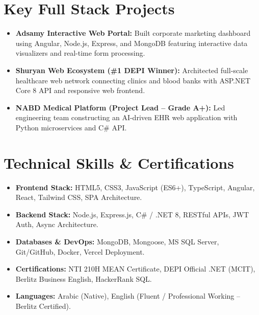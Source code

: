 \documentclass[11pt,a4paper]{article}
\begin{document}
\section{Key Full Stack Projects}
\begin{itemize}[leftmargin=*, nosep]
    \item \textbf{Adsamy Interactive Web Portal:} Built corporate marketing dashboard using Angular, Node.js, Express, and MongoDB featuring interactive data visualizers and real-time form processing.
    \item \textbf{Shuryan Web Ecosystem (\#1 DEPI Winner):} Architected full-scale healthcare web network connecting clinics and blood banks with ASP.NET Core 8 API and responsive web frontend.
    \item \textbf{NABD Medical Platform (Project Lead -- Grade A+):} Led engineering team constructing an AI-driven EHR web application with Python microservices and C\# API.
\end{itemize}

\section{Technical Skills \& Certifications}
\begin{itemize}[leftmargin=*, nosep]
    \item \textbf{Frontend Stack:} HTML5, CSS3, JavaScript (ES6+), TypeScript, Angular, React, Tailwind CSS, SPA Architecture.
    \item \textbf{Backend Stack:} Node.js, Express.js, C\# / .NET 8, RESTful APIs, JWT Auth, Async Architecture.
    \item \textbf{Databases \& DevOps:} MongoDB, Mongoose, MS SQL Server, Git/GitHub, Docker, Vercel Deployment.
    \item \textbf{Certifications:} NTI 210H MEAN Certificate, DEPI Official .NET (MCIT), Berlitz Business English, HackerRank SQL.
    \item \textbf{Languages:} Arabic (Native), English (Fluent / Professional Working -- Berlitz Certified).
\end{itemize}
\end{document}
